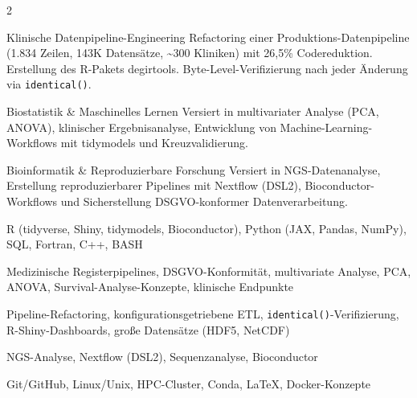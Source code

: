 \documentclass{thejus_cv}
\begin{document}
\begin{paracol}{2}
\switchcolumn


\vspace{-0.5em}

\cvstrength{\faStar}
           {Klinische Datenpipeline-Engineering}
           {Refactoring einer Produktions-Datenpipeline (1.834 Zeilen, 143K Datens\"atze, \textasciitilde300 Kliniken) mit 26,5\% Codereduktion. Erstellung des R-Pakets degirtools. Byte-Level-Verifizierung nach jeder \"Anderung via \texttt{identical()}.}

\cvstrength{\faLightbulb}
           {Biostatistik \& Maschinelles Lernen}
           {Versiert in multivariater Analyse (PCA, ANOVA), klinischer Ergebnisanalyse, Entwicklung von Machine-Learning-Workflows mit tidymodels und Kreuzvalidierung.}

\cvstrength{\faAward}
           {Bioinformatik \& Reproduzierbare Forschung}
           {Versiert in NGS-Datenanalyse, Erstellung reproduzierbarer Pipelines mit Nextflow (DSL2), Bioconductor-Workflows und Sicherstellung DSGVO-konformer Datenverarbeitung.}

\vspace{-0.5em}

         {R (tidyverse, Shiny, tidymodels, Bioconductor), Python (JAX, Pandas, NumPy), SQL, Fortran, C++, BASH}

         {Medizinische Registerpipelines, DSGVO-Konformit\"at, multivariate Analyse, PCA, ANOVA, Survival-Analyse-Konzepte, klinische Endpunkte}

         {Pipeline-Refactoring, konfigurationsgetriebene ETL, \texttt{identical()}-Verifizierung, R-Shiny-Dashboards, gro\ss{}e Datens\"atze (HDF5, NetCDF)}

         {NGS-Analyse, Nextflow (DSL2), Sequenzanalyse, Bioconductor}

         {Git/GitHub, Linux/Unix, HPC-Cluster, Conda, LaTeX, Docker-Konzepte}

\vspace{-0.5em}




\end{paracol}
\end{document}
